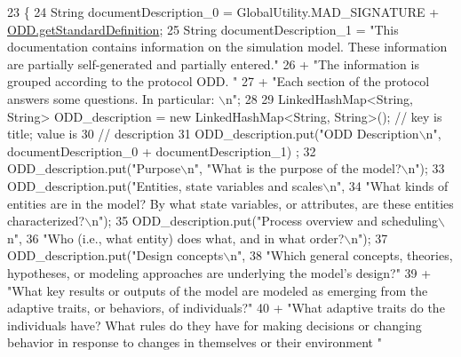 \begin{DoxyCode}
23                                                                    \{
24         String documentDescription\_0 = GlobalUtility.MAD\_SIGNATURE + 
      \hyperlink{classit_1_1isislab_1_1masonassisteddocumentation_1_1_o_d_d_1_1_o_d_d_a35a4a216476b294074ba15334011612e}{ODD.getStandardDefinition};
25         String documentDescription\_1 = \textcolor{stringliteral}{"This documentation contains information on the simulation model.
       These information are partially self-generated and partially entered."}
26                 + \textcolor{stringliteral}{"The information is grouped according to the protocol ODD. "}
27                 + \textcolor{stringliteral}{"Each section of the protocol answers some questions. In particular: \(\backslash\)n"};
28         
29         LinkedHashMap<String, String> ODD\_description = \textcolor{keyword}{new} LinkedHashMap<String, String>(); \textcolor{comment}{// key is
       title; value is}
30                                                         \textcolor{comment}{// description}
31         ODD\_description.put(\textcolor{stringliteral}{"ODD Description\(\backslash\)n"}, documentDescription\_0 + documentDescription\_1) ;
32         ODD\_description.put(\textcolor{stringliteral}{"Purpose\(\backslash\)n"}, \textcolor{stringliteral}{"What is the purpose of the model?\(\backslash\)n"});
33         ODD\_description.put(\textcolor{stringliteral}{"Entities, state variables and scales\(\backslash\)n"},
34                         \textcolor{stringliteral}{"What kinds of entities are in the model? By what state variables, or attributes,
       are these entities characterized?\(\backslash\)n"});
35         ODD\_description.put(\textcolor{stringliteral}{"Process overview and scheduling\(\backslash\)n"},
36                 \textcolor{stringliteral}{"Who (i.e., what entity) does what, and in what order?\(\backslash\)n"});
37         ODD\_description.put(\textcolor{stringliteral}{"Design concepts\(\backslash\)n"},
38                         \textcolor{stringliteral}{"Which general concepts, theories, hypotheses, or modeling approaches are
       underlying the model's design?"}
39                                 + \textcolor{stringliteral}{"What key results or outputs of the model are modeled as emerging from
       the adaptive traits, or behaviors, of individuals?"}
40                                 + \textcolor{stringliteral}{"What adaptive traits do the individuals have? What rules do they have
       for making decisions or changing behavior in response to changes in themselves or their environment "}

\end{DoxyCode}
